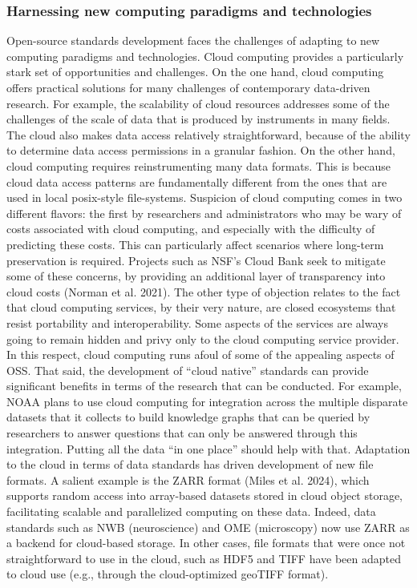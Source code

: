 \documentclass[
  letterpaper,
  DIV=11,
  numbers=noendperiod]{scrartcl}
\begin{document}
\subsubsection{Harnessing new computing paradigms and
technologies}\label{harnessing-new-computing-paradigms-and-technologies}

Open-source standards development faces the challenges of adapting to
new computing paradigms and technologies. Cloud computing provides a
particularly stark set of opportunities and challenges. On the one hand,
cloud computing offers practical solutions for many challenges of
contemporary data-driven research. For example, the scalability of cloud
resources addresses some of the challenges of the scale of data that is
produced by instruments in many fields. The cloud also makes data access
relatively straightforward, because of the ability to determine data
access permissions in a granular fashion. On the other hand, cloud
computing requires reinstrumenting many data formats. This is because
cloud data access patterns are fundamentally different from the ones
that are used in local posix-style file-systems. Suspicion of cloud
computing comes in two different flavors: the first by researchers and
administrators who may be wary of costs associated with cloud computing,
and especially with the difficulty of predicting these costs. This can
particularly affect scenarios where long-term preservation is required.
Projects such as NSF's Cloud Bank seek to mitigate some of these
concerns, by providing an additional layer of transparency into cloud
costs (Norman et al. 2021). The other type of objection relates to the
fact that cloud computing services, by their very nature, are closed
ecosystems that resist portability and interoperability. Some aspects of
the services are always going to remain hidden and privy only to the
cloud computing service provider. In this respect, cloud computing runs
afoul of some of the appealing aspects of OSS. That said, the
development of ``cloud native'' standards can provide significant
benefits in terms of the research that can be conducted. For example,
NOAA plans to use cloud computing for integration across the multiple
disparate datasets that it collects to build knowledge graphs that can
be queried by researchers to answer questions that can only be answered
through this integration. Putting all the data ``in one place'' should
help with that. Adaptation to the cloud in terms of data standards has
driven development of new file formats. A salient example is the ZARR
format (Miles et al. 2024), which supports random access into
array-based datasets stored in cloud object storage, facilitating
scalable and parallelized computing on these data. Indeed, data
standards such as NWB (neuroscience) and OME (microscopy) now use ZARR
as a backend for cloud-based storage. In other cases, file formats that
were once not straightforward to use in the cloud, such as HDF5 and TIFF
have been adapted to cloud use (e.g., through the cloud-optimized
geoTIFF format).
\end{document}
